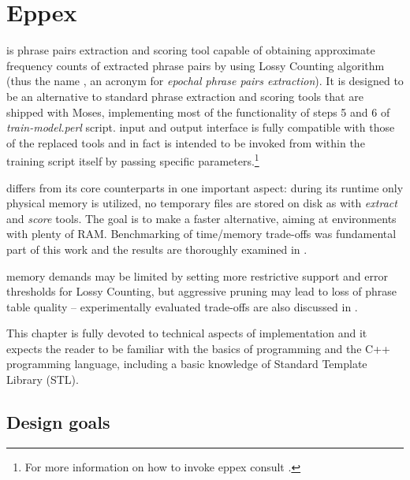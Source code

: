 
\chapter{Eppex}
\label{chap:eppex}

\Eppex{} is phrase pairs extraction and scoring tool capable of obtaining approximate
frequency counts of extracted phrase pairs by using Lossy Counting algorithm
(thus the name \eppex{}, an acronym for \emph{epochal phrase pairs extraction}).
It is designed to be an alternative to standard phrase extraction and scoring tools that
are shipped with Moses, implementing most of the functionality of steps 5 and 6 of
\emph{train-model.perl} script.
\Eppex{} input and output interface is fully compatible with those of the replaced tools
and \eppex{} in fact is intended to be invoked from within the training script itself
by passing specific parameters.\footnote{For more information on how to invoke eppex consult
.}

\Eppex{} differs from its core counterparts in one important aspect: during its runtime
only physical memory is utilized, no temporary files are stored on disk as with \emph{extract}
and \emph{score} tools.
The goal is to make \eppex{} a faster alternative, aiming at environments with plenty of RAM.
Benchmarking of time/memory trade-offs was fundamental part of this work and the results are
thoroughly examined in .

\Eppex{} memory demands may be limited by setting more restrictive support and error thresholds
for Lossy Counting, but aggressive pruning may lead to loss of phrase table quality --
experimentally evaluated trade-offs are also discussed in .

This chapter is fully devoted to technical aspects of implementation and it expects the reader
to be familiar with the basics of programming and the C++ programming language, including
a basic knowledge of Standard Template Library (STL).

\section{Design goals}


